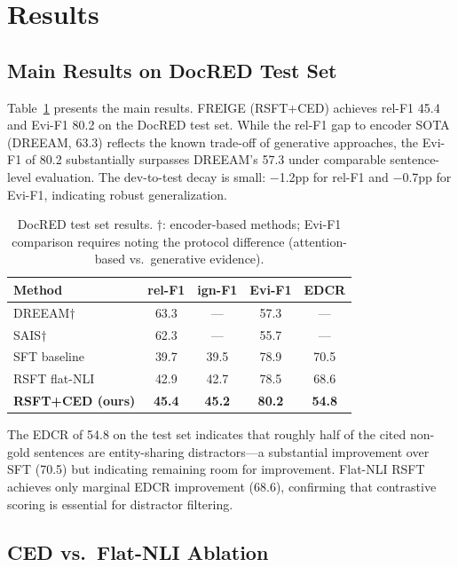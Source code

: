 \documentclass[11pt,a4paper]{article}
\newcommand{\method}{FREIGE}
\begin{document}
\section{Results}

\subsection{Main Results on DocRED Test Set}

Table~\ref{tab:test} presents the main results. \method{} (RSFT+CED) achieves rel-F1 45.4 and Evi-F1 80.2 on the DocRED test set. While the rel-F1 gap to encoder SOTA (DREEAM, 63.3) reflects the known trade-off of generative approaches, the Evi-F1 of 80.2 substantially surpasses DREEAM's 57.3 under comparable sentence-level evaluation. The dev-to-test decay is small: $-$1.2pp for rel-F1 and $-$0.7pp for Evi-F1, indicating robust generalization.

\begin{table}[t]
\centering
\caption{DocRED test set results. $\dagger$: encoder-based methods; Evi-F1 comparison requires noting the protocol difference (attention-based vs.\ generative evidence).}
\label{tab:test}
\begin{tabular}{lcccc}
\toprule
\textbf{Method} & \textbf{rel-F1} & \textbf{ign-F1} & \textbf{Evi-F1} & \textbf{EDCR} \\
\midrule
DREEAM$\dagger$ & 63.3 & --- & 57.3 & --- \\
SAIS$\dagger$ & 62.3 & --- & 55.7 & --- \\
\midrule
SFT baseline & 39.7 & 39.5 & 78.9 & 70.5 \\
RSFT flat-NLI & 42.9 & 42.7 & 78.5 & 68.6 \\
\textbf{RSFT+CED (ours)} & \textbf{45.4} & \textbf{45.2} & \textbf{80.2} & \textbf{54.8} \\
\bottomrule
\end{tabular}
\end{table}

The EDCR of 54.8 on the test set indicates that roughly half of the cited non-gold sentences are entity-sharing distractors---a substantial improvement over SFT (70.5) but indicating remaining room for improvement. Flat-NLI RSFT achieves only marginal EDCR improvement (68.6), confirming that contrastive scoring is essential for distractor filtering.

\subsection{CED vs.\ Flat-NLI Ablation}
\end{document}
